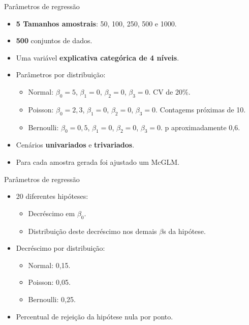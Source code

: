 \documentclass[
  ignorenonframetext,
  serif,
  professionalfont,
  usenames,
  dvipsnames,
  aspectratio = 169]{beamer}
\begin{document}
\begin{frame}{Parâmetros de regressão}
\protect\hypertarget{paruxe2metros-de-regressuxe3o}{}
\begin{itemize}
  \itemsep 2ex
    
  \item \textbf{5 Tamanhos amostrais}: 50, 100, 250, 500 e  1000.

  \item \textbf{500} conjuntos de dados.

  \item Uma variável \textbf{explicativa categórica de 4 níveis}.

  \item Parâmetros por distribuição:
    \begin{itemize}
        \item Normal: $\beta_0 = 5$, $\beta_1 = 0$, $\beta_2 = 0$, $\beta_3 = 0$. CV de 20\%.
        \item Poisson: $\beta_0 = 2,3$, $\beta_1 = 0$, $\beta_2 = 0$, $\beta_3 = 0$. Contagems próximas de 10.
        \item Bernoulli: $\beta_0 = 0,5$, $\beta_1 = 0$, $\beta_2 = 0$, $\beta_3 = 0$. p aproximadamente 0,6.
        \end{itemize}
      
  \item Cenários \textbf{univariados} e \textbf{trivariados}.

  \item Para cada amostra gerada foi ajustado um McGLM.

\end{itemize}
\end{frame}

\begin{frame}{Parâmetros de regressão}
\protect\hypertarget{paruxe2metros-de-regressuxe3o-1}{}
\begin{itemize}
  \itemsep 2ex

  \item 20 diferentes hipóteses:
    \begin{itemize}
      \item Decréscimo em $\beta_0$.
      \item Distribuição deste decréscimo nos demais $\beta$s da hipótese.
    \end{itemize}

  \item Decréscimo por distribuição:
    \begin{itemize}
        \item Normal: 0,15.
        \item Poisson: 0,05.
        \item Bernoulli: 0,25. 
       \end{itemize}

  \item Percentual de rejeição da hipótese nula por ponto. 

\end{itemize}
\end{frame}
\end{document}
